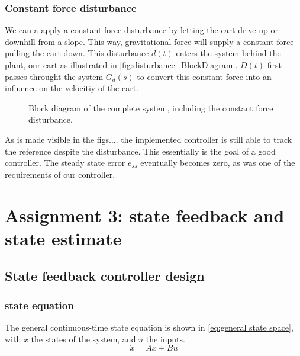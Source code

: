 \documentclass[a4paper]{article}
\newcommand{\newpar}{\vspace{.3cm}\noindent}
\begin{document}
\subsubsection{Constant force disturbance}
We can a apply a constant force disturbance by letting the cart drive up or downhill from a slope. This way, gravitational force will supply a constant force pulling the cart down. This disturbance $d(t)$ enters the system behind the plant, our cart as illustrated in \autoref{fig:disturbance_BlockDiagram}. $D(t)$ first passes throught the system $G_d(s)$ to convert this constant force into an influence on the velocitiy of the cart. 

\begin{figure}[H]
    \caption{Block diagram of the complete system, including the constant force disturbance.}
    \label{fig:disturbance_BlockDiagram}
\end{figure}



\newpar
As is made visible in the figs.... the implemented controller is still able to track the reference despite the disturbance. This essentially is the goal of a good controller. The steady state error $e_{ss}$ eventually becomes zero, as was one of the requirements of our controller.



\section{Assignment 3: state feedback and state estimate}
\subsection{State feedback controller design}
\subsubsection{state equation}

The general continuous-time state equation is shown in \autoref{eq:general state space}, with $x$ the states of the system, and $u$ the inputs.
    \begin{equation}
        \dot{x} = Ax + Bu
        \label{eq:general state space}
    \end{equation}
\end{document}
